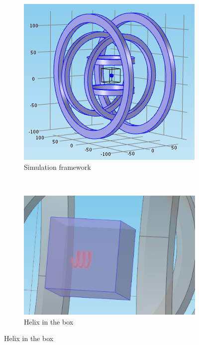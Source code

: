 \documentclass[12pt,a4paper,titlepage]{report}
\begin{document}



\begin{figure}
        \centering
        \begin{subfigure}[b]{0.43\textwidth}
                \includegraphics[width=\textwidth]{simulation}
                \caption{Simulation framework}
                \label{simulation}
        \end{subfigure}~~ 
\begin{subfigure}[b]{0.565\textwidth}
                \includegraphics[width=\textwidth]{helix-in-box}
                \caption{Helix in the box}
                \label{helix-in-box}
        \end{subfigure}
      

\end{figure}
\end{document}
